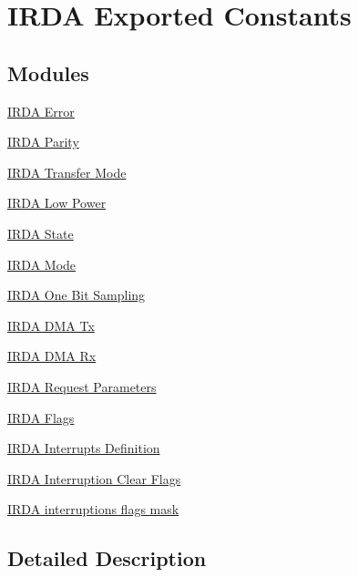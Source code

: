 \hypertarget{group___i_r_d_a___exported___constants}{}\section{I\+R\+DA Exported Constants}
\label{group___i_r_d_a___exported___constants}
\subsection*{Modules}
\begin{DoxyCompactItemize}
\item 
\hyperlink{group___i_r_d_a___error}{I\+R\+D\+A Error}
\item 
\hyperlink{group___i_r_d_a___parity}{I\+R\+D\+A Parity}
\item 
\hyperlink{group___i_r_d_a___transfer___mode}{I\+R\+D\+A Transfer Mode}
\item 
\hyperlink{group___i_r_d_a___low___power}{I\+R\+D\+A Low Power}
\item 
\hyperlink{group___i_r_d_a___state}{I\+R\+D\+A State}
\item 
\hyperlink{group___i_r_d_a___mode}{I\+R\+D\+A Mode}
\item 
\hyperlink{group___i_r_d_a___one___bit}{I\+R\+D\+A One Bit Sampling}
\item 
\hyperlink{group___i_r_d_a___d_m_a___tx}{I\+R\+D\+A D\+M\+A Tx}
\item 
\hyperlink{group___i_r_d_a___d_m_a___rx}{I\+R\+D\+A D\+M\+A Rx}
\item 
\hyperlink{group___i_r_d_a___request___parameters}{I\+R\+D\+A Request Parameters}
\item 
\hyperlink{group___i_r_d_a___flags}{I\+R\+D\+A Flags}
\item 
\hyperlink{group___i_r_d_a___interrupt__definition}{I\+R\+D\+A Interrupts Definition}
\item 
\hyperlink{group___i_r_d_a___i_t___c_l_e_a_r___flags}{I\+R\+D\+A Interruption Clear Flags}
\item 
\hyperlink{group___i_r_d_a___interruption___mask}{I\+R\+D\+A interruptions flags mask}
\end{DoxyCompactItemize}


\subsection{Detailed Description}
